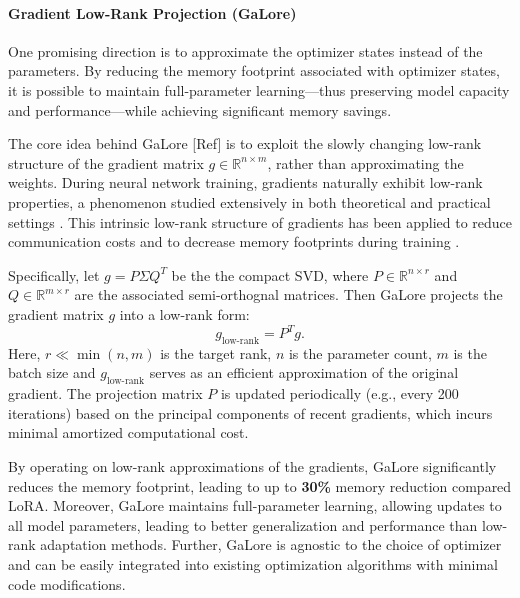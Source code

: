 \paragraph{Gradient Low-Rank Projection (GaLore)}

One promising direction is to approximate the optimizer states instead of the parameters. By reducing the memory footprint associated with optimizer states, it is possible to maintain full-parameter learning—thus preserving model capacity and performance—while achieving significant memory savings.

The core idea behind GaLore [Ref] is to exploit the slowly changing low-rank structure of the gradient matrix $g \in \mathbb{R}^{n \times m}$, rather than approximating the weights. During neural network training, gradients naturally exhibit low-rank properties, a phenomenon studied extensively in both theoretical and practical settings \citep{zhaoZerOInitializationInitializing2022,cossonLowRankGradientDescent2023,yang2023spectral}. This intrinsic low-rank structure of gradients has been applied to reduce communication costs \citep{wangATOMOCommunicationefficientLearning,vogelsPowerGossipPracticalLowRank2020} and to decrease memory footprints during training \citep{gooneratneLowrankGradientApproximation2020,huangLowRankGradientDescent2023,modoranuErrorFeedbackCan2024}.

Specifically, let \(g = P \Sigma Q^{T}\) be the the compact SVD, where \(P \in \mathbb{R}^{n \times r}\) and \(Q \in \mathbb{R}^{m \times r}\) are the associated semi-orthognal matrices.  Then GaLore projects the gradient matrix $g$ into a low-rank form:
\begin{equation}
 g_{\text{low-rank}} = P^{T} g.
\end{equation}
Here, $r \ll \min(n, m)$ is the target rank, \(n\) is the parameter count, \(m\) is the batch size and $g_{\text{low-rank}}$ serves as an efficient approximation of the original gradient. The projection matrix $P$ is updated periodically (e.g., every 200 iterations) based on the principal components of recent gradients, which incurs minimal amortized computational cost.

By operating on low-rank approximations of the gradients, GaLore significantly reduces the memory footprint, leading to up to \textbf{30\%} memory reduction compared LoRA. Moreover, GaLore maintains full-parameter learning, allowing updates to all model parameters, leading to better generalization and performance than low-rank adaptation methods. Further, GaLore is agnostic to the choice of optimizer and can be easily integrated into existing optimization algorithms with minimal code modifications.

